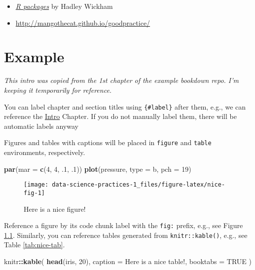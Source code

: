\documentclass[
]{book}
\newenvironment{Shaded}{\begin{snugshade}}{\end{snugshade}}
\newcommand{\DataTypeTok}[1]{\textcolor[rgb]{0.13,0.29,0.53}{#1}}
\newcommand{\DecValTok}[1]{\textcolor[rgb]{0.00,0.00,0.81}{#1}}
\newcommand{\FloatTok}[1]{\textcolor[rgb]{0.00,0.00,0.81}{#1}}
\newcommand{\KeywordTok}[1]{\textcolor[rgb]{0.13,0.29,0.53}{\textbf{#1}}}
\newcommand{\NormalTok}[1]{#1}
\newcommand{\OperatorTok}[1]{\textcolor[rgb]{0.81,0.36,0.00}{\textbf{#1}}}
\newcommand{\OtherTok}[1]{\textcolor[rgb]{0.56,0.35,0.01}{#1}}
\newcommand{\StringTok}[1]{\textcolor[rgb]{0.31,0.60,0.02}{#1}}
\begin{document}
\begin{itemize}
\item
  \href{http://r-pkgs.had.co.nz/}{\emph{R packages}} by Hadley Wickham
\item
  \url{http://mangothecat.github.io/goodpractice/}
\end{itemize}

\hypertarget{example-bookdown}{%
\chapter{Example}\label{example-bookdown}}

\emph{This intro was copied from the 1st chapter of the example bookdown repo. I'm keeping it temporarily for reference.}

You can label chapter and section titles using \texttt{\{\#label\}} after them, e.g., we can reference the \protect\hyperlink{intro}{Intro} Chapter. If you do not manually label them, there will be automatic labels anyway

Figures and tables with captions will be placed in \texttt{figure} and \texttt{table} environments, respectively.

\begin{Shaded}
\begin{Highlighting}[]
\KeywordTok{par}\NormalTok{(}\DataTypeTok{mar =} \KeywordTok{c}\NormalTok{(}\DecValTok{4}\NormalTok{, }\DecValTok{4}\NormalTok{, }\FloatTok{.1}\NormalTok{, }\FloatTok{.1}\NormalTok{))}
\KeywordTok{plot}\NormalTok{(pressure, }\DataTypeTok{type =} \StringTok{\textquotesingle{}b\textquotesingle{}}\NormalTok{, }\DataTypeTok{pch =} \DecValTok{19}\NormalTok{)}
\end{Highlighting}
\end{Shaded}

\begin{figure}

{\centering \texttt{[image: data-science-practices-1\_files/figure-latex/nice-fig-1]} 

}

\caption{Here is a nice figure!}\label{fig:nice-fig}
\end{figure}

Reference a figure by its code chunk label with the \texttt{fig:} prefix, e.g., see Figure \ref{fig:nice-fig}. Similarly, you can reference tables generated from \texttt{knitr::kable()}, e.g., see Table \ref{tab:nice-tab}.

\begin{Shaded}
\begin{Highlighting}[]
\NormalTok{knitr}\OperatorTok{::}\KeywordTok{kable}\NormalTok{(}
  \KeywordTok{head}\NormalTok{(iris, }\DecValTok{20}\NormalTok{), }\DataTypeTok{caption =} \StringTok{\textquotesingle{}Here is a nice table!\textquotesingle{}}\NormalTok{,}
  \DataTypeTok{booktabs =} \OtherTok{TRUE}
\NormalTok{)}
\end{Highlighting}
\end{Shaded}
\end{document}
